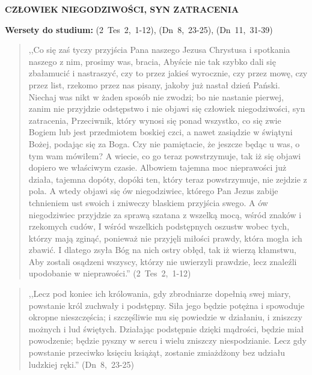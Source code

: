 \documentclass[10pt,a4paper,oneside]{article}
\begin{document}
\centerline{\textbf{\MakeUppercase{Człowiek niegodziwości, syn zatracenia}}}
\begin{center}
\textbf{Wersety do studium:} (2~Tes~2,~1-12), (Dn~8,~23-25), (Dn~11,~31-39)
\end{center}
\begin{quote}
,,Co się zaś tyczy przyjścia Pana naszego Jezusa Chrystusa i spotkania naszego z nim, prosimy was, bracia, Abyście nie tak szybko dali się zbałamucić i nastraszyć, czy to przez jakieś wyrocznie, czy przez mowę, czy przez list, rzekomo przez nas pisany, jakoby już nastał dzień Pański. Niechaj was nikt w żaden sposób nie zwodzi; bo nie nastanie pierwej, zanim nie przyjdzie odstępstwo i nie objawi się człowiek niegodziwości, syn zatracenia, Przeciwnik, który wynosi się ponad wszystko, co się zwie Bogiem lub jest przedmiotem boskiej czci, a nawet zasiądzie w świątyni Bożej, podając się za Boga. Czy nie pamiętacie, że jeszcze będąc u was, o tym wam mówiłem? A wiecie, co go teraz powstrzymuje, tak iż się objawi dopiero we właściwym czasie. Albowiem tajemna moc nieprawości już działa, tajemna dopóty, dopóki ten, który teraz powstrzymuje, nie zejdzie z pola. A wtedy objawi się ów niegodziwiec, którego Pan Jezus zabije tchnieniem ust swoich i zniweczy blaskiem przyjścia swego. A ów niegodziwiec przyjdzie za sprawą szatana z wszelką mocą, wśród znaków i rzekomych cudów, I wśród wszelkich podstępnych oszustw wobec tych, którzy mają zginąć, ponieważ nie przyjęli miłości prawdy, która mogła ich zbawić. I dlatego zsyła Bóg na nich ostry obłęd, tak iż wierzą kłamstwu, Aby zostali osądzeni wszyscy, którzy nie uwierzyli prawdzie, lecz znaleźli upodobanie w nieprawości.'' (2~Tes~2,~1-12)
\end{quote}
\begin{quote}
,,Lecz pod koniec ich królowania, gdy zbrodniarze dopełnią swej miary, powstanie król zuchwały i podstępny. Siła jego będzie potężna i spowoduje okropne nieszczęścia; i szczęśliwie mu się powiedzie w działaniu, i zniszczy możnych i lud świętych. Działając podstępnie dzięki mądrości, będzie miał powodzenie; będzie pyszny w sercu i wielu zniszczy niespodzianie. Lecz gdy powstanie przeciwko księciu książąt, zostanie zmiażdżony bez udziału ludzkiej ręki.'' (Dn~8,~23-25)
\end{quote}
\end{document}

